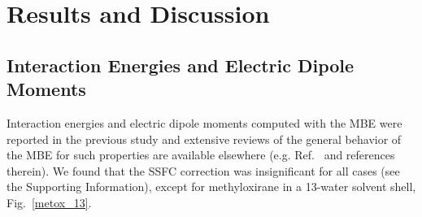 \section{Results and Discussion} \label{se:resp1}
         
\subsection{Interaction Energies and Electric Dipole Moments} 
Interaction energies and electric dipole moments computed with the MBE were reported in the previous study\cite{Mach2014} and extensive reviews of the general behavior of the MBE for such properties are available elsewhere (e.g. Ref.~ and references therein).  We found that the SSFC correction was insignificant for all cases (see the Supporting Information), except for methyloxirane in a 13-water solvent shell, Fig.\ \ref{metox_13}.
